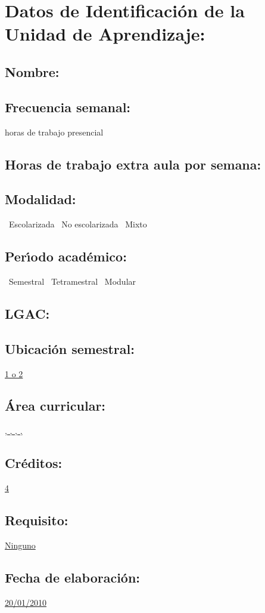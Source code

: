 \documentclass[10 pt]{article}
\begin{document}

\section{Datos de Identificaci\'{o}n de la Unidad de Aprendizaje:}
\subsection{Nombre:} 
\subsection{Frecuencia semanal:} horas de trabajo presencial 
\subsection{Horas de trabajo extra aula por semana:} 
\subsection{Modalidad:} \yes~Escolarizada \no~No escolarizada \no~Mixto
\subsection{Per\'{\i}odo acad\'{e}mico:} \yes~Semestral
\no~Tetramestral \no~Modular
\subsection{LGAC:} \underline{\seys}
\subsection{Ubicaci\'{o}n semestral:} \underline{1 o 2}
\subsection{\'{A}rea curricular:} \underline{\fb, \fa, \da, \le, \inv}
\subsection{Cr\'{e}ditos:} \underline{4}
\subsection{Requisito:} \underline{Ninguno}
\subsection{Fecha de elaboraci\'{o}n:} \underline{20/01/2010}
\end{document}
